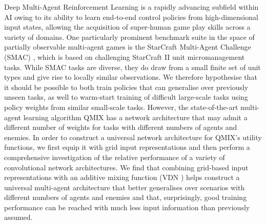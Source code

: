 Deep Multi-Agent Reinforcement Learning is a rapidly advancing subfield within AI owing to its ability to learn end-to-end control policies from high-dimensional input states, allowing the acquisition of super-human game play skills across a variety of domains. One particularly prominent benchmark suite in the space of partially observable multi-agent games is the StarCraft Multi-Agent Challenge (SMAC) \cite{smac}, which is based on challenging StarCraft II unit micromanagement tasks. 
While SMAC tasks are diverse, they do draw from a small finite set of unit types and give rise to locally similar observations. We therefore hypothesise that it should be possible to both train policies that can generalise over previously unseen tasks, as well to warm-start training of difficult large-scale tasks using policy weights from similar small-scale tasks.
However, the state-of-the-art multi-agent learning algorithm QMIX \cite{qmixcite} has a network architecture that may admit a different number of weights for tasks with different numbers of agents and enemies.  
In order to construct a universal network architecture for QMIX's utility functions, we first equip it with grid input representations and then perform a comprehensive investigation of the relative performance of a variety of convolutional network architectures. We find that combining grid-based input representations with an additive mixing function (VDN \cite{vdn}) helps construct a universal multi-agent architecture that better generalises over scenarios with different numbers of agents and enemies and that, surprisingly, good training performance can be reached with much less input information than previously assumed.
